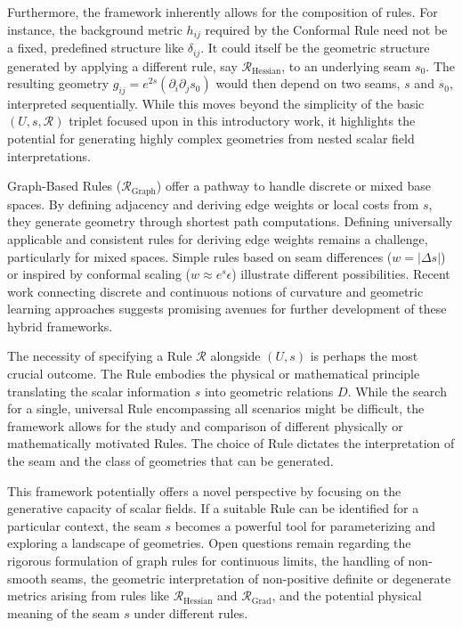 \documentclass[twoside,twocolumn]{article}
\numberwithin{equation}{section} %
\begin{document}
Furthermore, the framework inherently allows for the composition of rules. For instance, the background metric $h_{ij}$ required by the Conformal Rule need not be a fixed, predefined structure like $\delta_{ij}$. It could itself be the geometric structure generated by applying a different rule, say $\mathcal{R}_{\text{Hessian}}$, to an underlying seam $s_0$. The resulting geometry $g_{ij} = e^{2s} (\partial_i \partial_j s_0)$ would then depend on two seams, $s$ and $s_0$, interpreted sequentially. While this moves beyond the simplicity of the basic $(U, s, \mathcal{R})$ triplet focused upon in this introductory work, it highlights the potential for generating highly complex geometries from nested scalar field interpretations.

Graph-Based Rules ($\mathcal{R}_{\text{Graph}}$) offer a pathway to handle discrete or mixed base spaces. By defining adjacency and deriving edge weights or local costs from $s$, they generate geometry through shortest path computations. Defining universally applicable and consistent rules for deriving edge weights remains a challenge, particularly for mixed spaces. Simple rules based on seam differences ($w=|\Delta s|$) or inspired by conformal scaling ($w \approx e^s \epsilon$) illustrate different possibilities.
Recent work connecting discrete and continuous notions of curvature \cite{Ollivier2014Visual} and geometric learning approaches \cite{CoifmanLafon2006} suggests promising avenues for further development of these hybrid frameworks.

The necessity of specifying a Rule $\mathcal{R}$ alongside $(U, s)$ is perhaps the most crucial outcome. The Rule embodies the physical or mathematical principle translating the scalar information $s$ into geometric relations $D$. While the search for a single, universal Rule encompassing all scenarios might be difficult, the framework allows for the study and comparison of different physically or mathematically motivated Rules. The choice of Rule dictates the interpretation of the seam and the class of geometries that can be generated.

This framework potentially offers a novel perspective by focusing on the generative capacity of scalar fields. If a suitable Rule can be identified for a particular context, the seam $s$ becomes a powerful tool for parameterizing and exploring a landscape of geometries. Open questions remain regarding the rigorous formulation of graph rules for continuous limits, the handling of non-smooth seams, the geometric interpretation of non-positive definite or degenerate metrics arising from rules like $\mathcal{R}_{\text{Hessian}}$ and $\mathcal{R}_{\text{Grad}}$, and the potential physical meaning of the seam $s$ under different rules.
\end{document}
